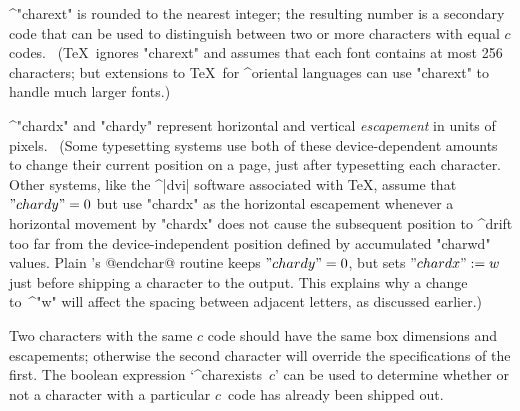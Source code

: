 {{{{\smallskip\textindent\bull^"charext" is rounded to the nearest integer;
the resulting number is a secondary code that can be used to distinguish
between two or more characters with equal $c$ codes. \ (\TeX\ ignores
"charext" and assumes that each font contains at most 256 characters; but
extensions to \TeX\ for ^{oriental} languages can use "charext" to handle
much larger fonts.)

\smallskip\textindent\bull^"chardx" and "chardy" represent horizontal and
vertical {\sl escapement\/} in units of pixels. \ (Some typesetting
systems use both of these device-dependent amounts to change their current
position on a page, just after typesetting each character. Other systems,
like the ^|dvi| software associated with \TeX, assume that $"chardy"=0$
but use "chardx" as the horizontal escapement whenever a horizontal
movement by "chardx" does not cause the subsequent position to ^{drift}
too far from the device-independent position defined by accumulated
"charwd" values. Plain \MF's @endchar@ routine keeps $"chardy"=0$, but
sets $"chardx":=w$ just before shipping a character to the output.  This
explains why a change to~^"w" will affect the spacing between adjacent
letters, as discussed earlier.) 

\ddanger Two characters with the same $c$ code
should have the same box dimensions and escapements; otherwise
the second character will override the specifications of the first. The boolean
expression `^{charexists}~$c$' can be used to determine whether or not
a character with a particular $c$~code has already been shipped out.

}}}}
